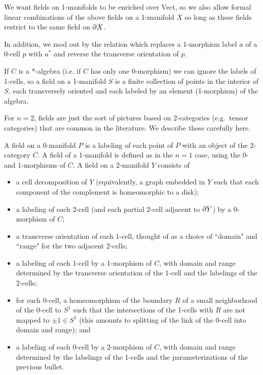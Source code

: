 We want fields on 1-manifolds to be enriched over Vect, so we also allow formal linear combinations
of the above fields on a 1-manifold $X$ so long as these fields restrict to the same field on $\partial X$.

In addition, we mod out by the relation which replaces
a 1-morphism label $a$ of a 0-cell $p$ with $a^*$ and reverse the transverse orientation of $p$.

If $C$ is a *-algebra (i.e. if $C$ has only one 0-morphism) we can ignore the labels
of 1-cells, so a field on a 1-manifold $S$ is a finite collection of points in the
interior of $S$, each transversely oriented and each labeled by an element (1-morphism)
of the algebra.

\medskip

For $n=2$, fields are just the sort of pictures based on 2-categories (e.g.\ tensor categories)
that are common in the literature.
We describe these carefully here.

A field on a 0-manifold $P$ is a labeling of each point of $P$ with
an object of the 2-category $C$.
A field of a 1-manifold is defined as in the $n=1$ case, using the 0- and 1-morphisms of $C$.
A field on a 2-manifold $Y$ consists of
\begin{itemize}
    \item a cell decomposition of $Y$ (equivalently, a graph embedded in $Y$ such
that each component of the complement is homeomorphic to a disk);
    \item a labeling of each 2-cell (and each partial 2-cell adjacent to $\partial Y$)
by a 0-morphism of $C$;
    \item a transverse orientation of each 1-cell, thought of as a choice of
``domain" and ``range" for the two adjacent 2-cells;
    \item a labeling of each 1-cell by a 1-morphism of $C$, with
domain and range determined by the transverse orientation of the 1-cell
and the labelings of the 2-cells;
    \item for each 0-cell, a homeomorphism of the boundary $R$ of a small neighborhood
of the 0-cell to $S^1$ such that the intersections of the 1-cells with $R$ are not mapped
to $\pm 1 \in S^1$
(this amounts to splitting of the link of the 0-cell into domain and range); and
    \item a labeling of each 0-cell by a 2-morphism of $C$, with domain and range
determined by the labelings of the 1-cells and the parameterizations of the previous
bullet.
\end{itemize}

